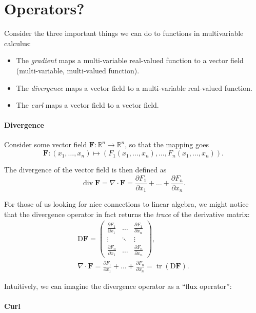 \documentclass[11pt]{article}
\renewcommand{\vec}[1]{\bm{#1}}
\newcommand{\real}{\mathbb R}
\newcommand{\Diff}{\mathrm D}
\DeclareMathOperator{\divergence}{div}
\DeclareMathOperator{\trace}{tr}
\begin{document}
\section*{Operators?}

Consider the three important things we can do to functions in multivariable calculus:
\begin{itemize}
\item The \emph{gradient} maps a multi-variable real-valued function to a vector field (multi-variable, multi-valued function).
\item The \emph{divergence} maps a vector field to a multi-variable real-valued function.
\item The \emph{curl} maps a vector field to a vector field.
\end{itemize}


\paragraph{Divergence} 

Consider some vector field \(\vec F \colon \real^n \to \real^n\), so that the mapping goes
\[
    \vec F \colon (x_1, \dots, x_n) \mapsto (F_1(x_1, \dots, x_n), \dots, F_n(x_1, \dots, x_n)).
\]

The divergence of the vector field is then defined as
\[
    \divergence \vec F = \nabla \cdot \vec F = \frac{\partial F_1}{\partial x_1} + \dots + \frac{\partial F_n}{\partial x_n}.
\]

For those of us looking for nice connections to linear algebra, we might notice that the divergence operator in fact returns the \emph{trace} of the derivative matrix:
\begin{gather*}
    \Diff \vec F =
    \begin{pmatrix}
        \frac{\partial F_1}{\partial x_1} & \dots & \frac{\partial F_1}{\partial x_n} \\
        \vdots & \ddots & \vdots \\
        \frac{\partial F_n}{\partial x_1} & \dots & \frac{\partial F_n}{\partial x_n}
    \end{pmatrix}, \\
    \nabla \cdot \vec F = \frac{\partial F_1}{\partial x_1} + \dots + \frac{\partial F_n}{\partial x_n} = \trace(\Diff \vec F).
\end{gather*}

Intuitively, we can imagine the divergence operator as a ``flux operator'':

\paragraph{Curl}
\end{document}

